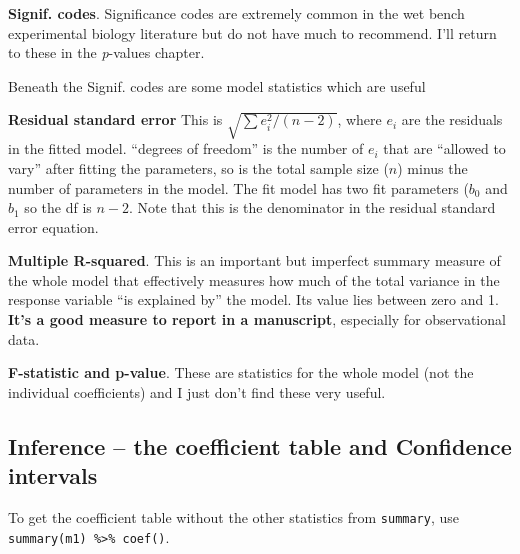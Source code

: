 \documentclass[]{book}
\newenvironment{Shaded}{\begin{snugshade}}{\end{snugshade}}
\newcommand{\KeywordTok}[1]{\textcolor[rgb]{0.13,0.29,0.53}{\textbf{#1}}}
\newcommand{\NormalTok}[1]{#1}
\newcommand{\OperatorTok}[1]{\textcolor[rgb]{0.81,0.36,0.00}{\textbf{#1}}}
\newcommand{\StringTok}[1]{\textcolor[rgb]{0.31,0.60,0.02}{#1}}
\begin{document}
\textbf{Signif. codes}. Significance codes are extremely common in the wet bench experimental biology literature but do not have much to recommend. I'll return to these in the \emph{p}-values chapter.

Beneath the Signif. codes are some model statistics which are useful

\textbf{Residual standard error} This is \(\sqrt{\sum{e_i^2}/(n-2)}\), where \(e_i\) are the residuals in the fitted model. ``degrees of freedom'' is the number of \(e_i\) that are ``allowed to vary'' after fitting the parameters, so is the total sample size (\(n\)) minus the number of parameters in the model. The fit model has two fit parameters (\(b_0\) and \(b_1\) so the df is \(n-2\). Note that this is the denominator in the residual standard error equation.

\textbf{Multiple R-squared}. This is an important but imperfect summary measure of the whole model that effectively measures how much of the total variance in the response variable ``is explained by'' the model. Its value lies between zero and 1. \textbf{It's a good measure to report in a manuscript}, especially for observational data.

\textbf{F-statistic and p-value}. These are statistics for the whole model (not the individual coefficients) and I just don't find these very useful.

\hypertarget{inference-the-coefficient-table-and-confidence-intervals}{%
\subsection{Inference -- the coefficient table and Confidence intervals}\label{inference-the-coefficient-table-and-confidence-intervals}}

To get the coefficient table without the other statistics from \texttt{summary}, use \texttt{summary(m1)\ \%\textgreater{}\%\ coef()}.

\begin{Shaded}
\end{Shaded}
\end{document}
